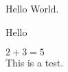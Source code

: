 \documentclass{article}
\begin{document}
  Hello World. \\
  \begin{comment}
 This is a comment too.
\end{comment}
    Hello     \\

  \begin{comment}
 And so is this one
     ...

\end{comment}
  $2+3=5$        \\
  This is a test.      \\
\end{document}
